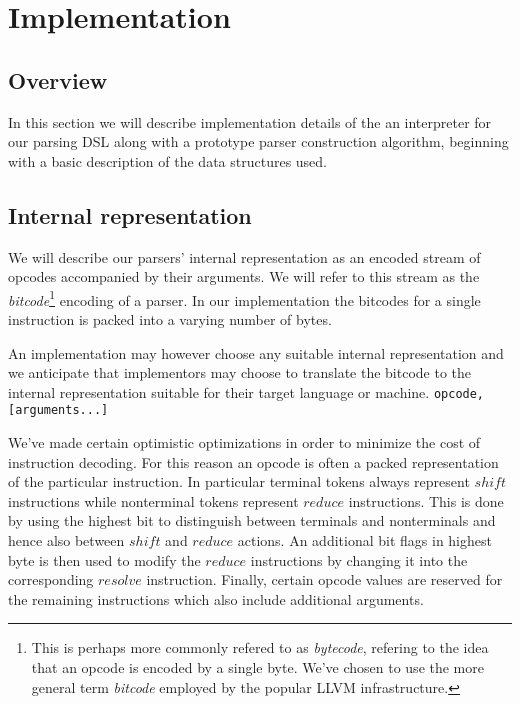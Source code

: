 \documentclass[11pt]{article}
\begin{document}
\section{Implementation}
\subsection{Overview}
In this section we will describe implementation details of the an interpreter for our parsing DSL along with a prototype parser construction algorithm, 
beginning with a basic description of the data structures used.\\

\subsection{Internal representation}
We will describe our parsers' internal representation as an encoded stream of opcodes accompanied by their arguments. 
We will refer to this stream as the \emph{bitcode}\footnote{This is perhaps more commonly refered to as \emph{bytecode}, refering to the idea that an opcode is encoded by a single byte. We've chosen to use the more general term \emph{bitcode} employed by the popular LLVM infrastructure.} encoding of a parser.
In our implementation the bitcodes for a single instruction is packed into a varying number of bytes.

An implementation may however choose any suitable internal representation and we anticipate that implementors may choose to translate the bitcode to the internal representation suitable for their target language or machine.
\texttt{opcode, [arguments...]}

We've made certain optimistic optimizations in order to minimize the cost of instruction decoding. 
For this reason an opcode is often a packed representation of the particular instruction.
In particular terminal tokens always represent $shift$ instructions while nonterminal tokens represent $reduce$ instructions.
This is done by using the highest bit to distinguish between terminals and nonterminals and hence also between $shift$ and $reduce$ actions.
An additional bit flags in highest byte is then used to modify the  $reduce$ instructions by changing it into the corresponding $resolve$ instruction.
Finally, certain opcode values are reserved for the remaining instructions which also include additional arguments.
\end{document}
